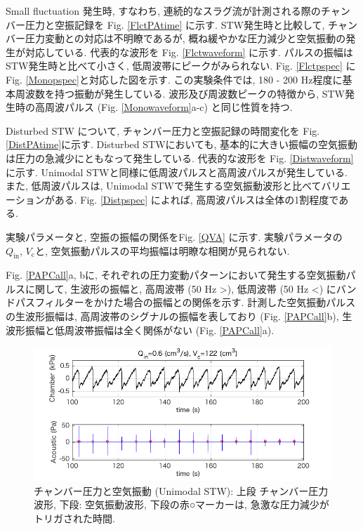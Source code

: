 \documentclass[12pt]{article}
\begin{document}
Small fluctuation 発生時, すなわち, 連続的なスラグ流が計測される際のチャンバー圧力と空振記録を Fig. \ref{FlctPAtime} に示す.  STW発生時と比較して, チャンバー圧力変動との対応は不明瞭であるが, 概ね緩やかな圧力減少と空気振動の発生が対応している. 代表的な波形を Fig. \ref{Flctwaveform} に示す. パルスの振幅はSTW発生時と比べて小さく, 低周波帯にピークがみられない. Fig. \ref{Flctpspec} に Fig. \ref{Monopspec}と対応した図を示す. この実験条件では, 180 - 200 Hz程度に基本周波数を持つ振動が発生している. 波形及び周波数ピークの特徴から, STW発生時の高周波パルス (Fig. \ref{Monowaveform}a-c) と同じ性質を持つ. 

Disturbed STW について, チャンバー圧力と空振記録の時間変化を Fig. \ref{DistPAtime}に示す. Disturbed STWにおいても, 基本的に大きい振幅の空気振動は圧力の急減少にともなって発生している. 代表的な波形を Fig. \ref{Distwaveform} に示す. Unimodal STWと同様に低周波パルスと高周波パルスが発生している. また, 低周波パルスは, Unimodal STWで発生する空気振動波形と比べてバリエーションがある. Fig. \ref{Distpspec} によれば, 高周波パルスは全体の1割程度である. 


実験パラメータと, 空振の振幅の関係をFig. \ref{QVA} に示す. 実験パラメータの $Q_\mathrm{in}$, $V_\mathrm{c}$と, 空気振動パルスの平均振幅は明瞭な相関が見られない. 

Fig. \ref{PAPCall}a, bに, それぞれの圧力変動パターンにおいて発生する空気振動パルスに関して, 生波形の振幅と, 高周波帯 (50 Hz >), 低周波帯 (50 Hz <) にバンドパスフィルターをかけた場合の振幅との関係を示す. 計測した空気振動パルスの生波形振幅は, 高周波帯のシグナルの振幅を表しており (Fig. \ref{PAPCall}b), 生波形振幅と低周波帯振幅は全く関係がない (Fig. \ref{PAPCall}a). 

\clearpage
\begin{figure}[H]
\begin{center}
\includegraphics[scale=1] {MonoPAtime.png} 
\caption[チャンバー圧力と空気振動: Unimodal STW]
{チャンバー圧力と空気振動 (Unimodal STW): 上段 チャンバー圧力波形, 下段: 空気振動波形, 下段の赤○マーカーは, 急激な圧力減少がトリガされた時間.}
\label{MonoPAtime}
\end{center}
\end{figure} 
\end{document}
